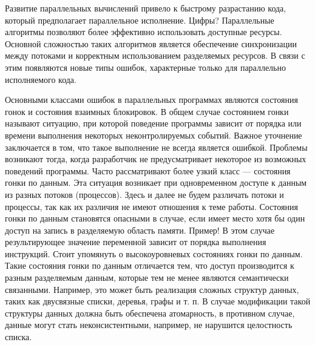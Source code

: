 

Развитие параллельных вычислений привело к быстрому разрастанию кода, который предполагает параллельное исполнение. Цифры? Параллельные алгоритмы позволяют более эффективно использовать доступные ресурсы. Основной сложностью таких алгоритмов является обеспечение синхронизации между потоками и корректным использованием разделяемых ресурсов. В связи с этим появляются новые типы ошибок, характерные только для параллельно исполняемого кода. 

Основными классами ошибок в параллельных программах являются состояния гонок и состояния взаимных блокировок. В общем случае состоянием гонки называют ситуацию, при которой поведение программы зависит от порядка или времени выполнения некоторых неконтролируемых событий. Важное уточнение заключается в том, что такое выполнение не всегда является ошибкой. Проблемы возникают тогда, когда разработчик не предусматривает некоторое из возможных поведений программы. Часто рассматривают более узкий класс — состояния гонки по данным. Эта ситуация возникает при одновременном доступе к данным из разных потоков (процессов). Здесь и далее не будем различать потоки и процессы, так как их различия не имеют отношения к теме работы. Состояния гонки по данным становятся опасными в случае, если имеет место хотя бы один доступ на запись в разделяемую область памяти. Пример! В этом случае результирующее значение переменной зависит от порядка выполнения инструкций. 
Стоит упомянуть о высокоуровневых состояниях гонки по данным. Такие состояния гонки по данным отличается тем, что доступ производится к разным разделяемым данным, которые тем не менее являются семантически связанными. Например, это может быть реализация сложных структур данных, таких как двусвязные списки, деревья, графы и т. п. В случае модификации такой структуры данных должна быть обеспечена атомарность, в противном случае, данные могут стать неконсистентными, например, не нарушится целостность списка. 
 
